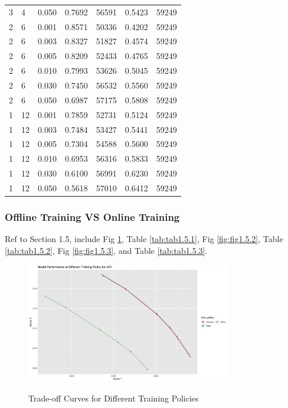 \documentclass{article}
\begin{document}
\begin{longtable}[htbp]{l|l|l|*{4}{c}}
    3 & 4 & 0.050 & 0.7692 & 56591 & 0.5423 & 59249\\
    2 & 6 & 0.001 & 0.8571 & 50336 & 0.4202 & 59249\\
    2 & 6 & 0.003 & 0.8327 & 51827 & 0.4574 & 59249\\
    2 & 6 & 0.005 & 0.8209 & 52433 & 0.4765 & 59249\\
    2 & 6 & 0.010 & 0.7993 & 53626 & 0.5045 & 59249\\
    2 & 6 & 0.030 & 0.7450 & 56532 & 0.5560 & 59249\\
    2 & 6 & 0.050 & 0.6987 & 57175 & 0.5808 & 59249\\
    1 & 12 & 0.001 & 0.7859 & 52731 & 0.5124 & 59249\\
    1 & 12 & 0.003 & 0.7484 & 53427 & 0.5441 & 59249\\
    1 & 12 & 0.005 & 0.7304 & 54588 & 0.5600 & 59249\\
    1 & 12 & 0.010 & 0.6953 & 56316 & 0.5833 & 59249\\
    1 & 12 & 0.030 & 0.6100 & 56991 & 0.6230 & 59249\\
    1 & 12 & 0.050 & 0.5618 & 57010 & 0.6412 & 59249\\
\end{longtable}

\subsubsection{Offline Training VS Online Training}
Ref to Section 1.5, include Fig \ref{fig:fig1.5.1}, Table \ref{tab:tab1.5.1}, Fig \ref{fig:fig1.5.2}, Table \ref{tab:tab1.5.2}, Fig \ref{fig:fig1.5.3}, and Table \ref{tab:tab1.5.3}.

\begin{figure}
    \caption{Trade-off Curves for Different Training Policies}
    \centering
    \includegraphics[width = 0.8\textwidth]{images/ModelPerformanceatDifferentTrainingPolicyforAR1.png}
    \label{fig:fig1.5.1}
\end{figure}
\end{document}
